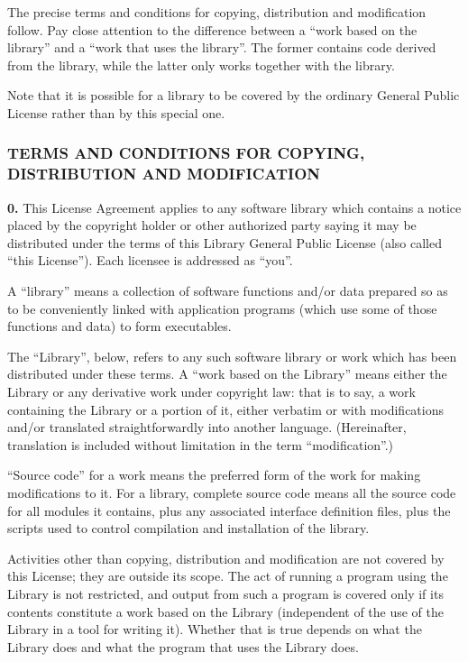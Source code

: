 \documentclass[]{article}
\begin{document}
The precise terms and conditions for copying, distribution and
modification follow. Pay close attention to the difference between a
``work based on the library'' and a ``work that uses the library''. The
former contains code derived from the library, while the latter only
works together with the library.

Note that it is possible for a library to be covered by the ordinary
General Public License rather than by this special one.

\subsubsection{TERMS AND CONDITIONS FOR COPYING, DISTRIBUTION AND
MODIFICATION}

\textbf{0.} This License Agreement applies to any software library which
contains a notice placed by the copyright holder or other authorized
party saying it may be distributed under the terms of this Library
General Public License (also called ``this License''). Each licensee is
addressed as ``you''.

A ``library'' means a collection of software functions and/or data
prepared so as to be conveniently linked with application programs
(which use some of those functions and data) to form executables.

The ``Library'', below, refers to any such software library or work
which has been distributed under these terms. A ``work based on the
Library'' means either the Library or any derivative work under
copyright law: that is to say, a work containing the Library or a
portion of it, either verbatim or with modifications and/or translated
straightforwardly into another language. (Hereinafter, translation is
included without limitation in the term ``modification''.)

``Source code'' for a work means the preferred form of the work for
making modifications to it. For a library, complete source code means
all the source code for all modules it contains, plus any associated
interface definition files, plus the scripts used to control compilation
and installation of the library.

Activities other than copying, distribution and modification are not
covered by this License; they are outside its scope. The act of running
a program using the Library is not restricted, and output from such a
program is covered only if its contents constitute a work based on the
Library (independent of the use of the Library in a tool for writing
it). Whether that is true depends on what the Library does and what the
program that uses the Library does.
\end{document}
